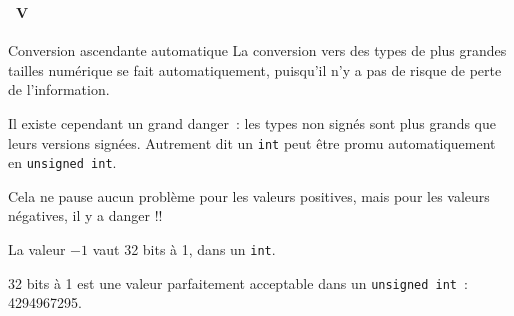 \begin{frame}[containsverbatim]
  \frametitle{\secname}
  \framesubtitle{\subsecname~V}

  \begin{alertblock}{Conversion ascendante automatique}
    La conversion vers des types de plus grandes tailles numérique se fait automatiquement, puisqu'il n'y a pas de risque de perte de l'information.
    \vspace{0.3cm}
    \par
    Il existe cependant un grand danger~: les types non signés sont plus grands que leurs versions signées. 
    Autrement dit un \verb|int| peut être promu automatiquement en \verb|unsigned int|. 
    \vspace{0.3cm}
    \par
    Cela ne pause aucun problème pour les valeurs positives, mais pour les valeurs négatives, il y a danger !!
    \vspace{0.3cm}
    \par
    La valeur $-1$ vaut 32 bits à 1, dans un \verb|int|. 
    \vspace{0.3cm}
    \par
    32 bits à 1 est une valeur parfaitement acceptable dans un \verb|unsigned int|~: 4294967295.    
  \end{alertblock}
\end{frame}


